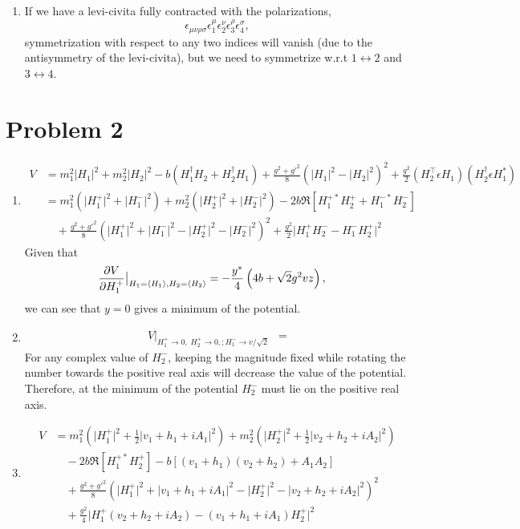 \documentclass[12pt]{article}
\newcommand{\magsq}[1]{\big|#1\big|^2}
\begin{document}
\begin{enumerate}[label=(\alph*)]
    \item If we have a levi-civita fully contracted with the polarizations,
    \[ \epsilon_{\mu\nu\rho\sigma}\epsilon_1^\mu\epsilon_2^\nu\epsilon_3^\rho\epsilon_4^\sigma, \]
    symmetrization with respect to any two indices will vanish (due to the antisymmetry of the levi-civita), but we need to symmetrize w.r.t $1\leftrightarrow2$ and $3\leftrightarrow4$.

\end{enumerate}

\section*{Problem 2}
\begin{enumerate}[label=(\alph*)]
    \item 
    \begin{align*}
        V &= m_1^2\magsq{H_1} + m_2^2\magsq{H_2} - b(H_1^\dag H_2 + H_2^\dag H_1) + \frac{g^2 + g'^2}{8}\left(\magsq{H_1}-\magsq{H_2}\right)^2 + \frac{g^2}{2}\left(H_2^\intercal\epsilon H_1\right)\left(H_2^\dag\epsilon H_1^*\right) \\
        &= m_1^2\left(\magsq{H_1^+} + \magsq{H_1^-}\right) + m_2^2\left(\magsq{H_2^+} + \magsq{H_2^-}\right) - 2b\Re[H_1^{+*}H_2^+ + H_1^{-*}H_2^{-}] \\
        &\quad + \frac{g^2 + g'^2}{8}\left(\magsq{H_1^+} + \magsq{H_1^-} - \magsq{H_2^+} - \magsq{H_2^-}\right)^2 + \frac{g^2}{2}\magsq{H_1^+H_2^- - H_1^-H_2^+}
    \end{align*}
    Given that
    \begin{align*}
        \pdv{V}{H_1^+}\bigr\lvert_{H_1 = \left<H_1\right>, H_2 = \left<H_2\right>} &= -\frac{y^*}{4}\left(4b + \sqrt{2}g^2vz\right),
    \end{align*}
    we can see that $y=0$ gives a minimum of the potential.

    \item 
    \begin{align*}
        V\bigr\lvert_{H_1^+\to0,\;H_2^+\to0,;H_1^-\to v/\sqrt{2}} &= 
    \end{align*}
    For any complex value of $H_2^-$, keeping the magnitude fixed while rotating the number towards the positive real axis will decrease the value of the potential. Therefore, at the minimum of the potential $H_2^-$ must lie on the positive real axis.

    \item 
    \begin{align*}
        V &= m_1^2\left(\magsq{H_1^+} + \frac{1}{2}\magsq{v_1 + h_1 + iA_1}\right) + m_2^2\left(\magsq{H_2^+} + \frac{1}{2}\magsq{v_2 + h_2 + iA_2}\right) \\
        &\quad - 2b\Re[H_1^{+*}H_2^+] - b\left[(v_1+h_1)(v_2 + h_2) + A_1A_2\right] \\
        &\quad + \frac{g^2 + g'^2}{8}\left(\magsq{H_1^+} + \magsq{v_1 + h_1 + iA_1} - \magsq{H_2^+} - \magsq{v_2 + h_2 + iA_2}\right)^2 \\
        &\quad + \frac{g^2}{4}\magsq{H_1^+\left(v_2 + h_2 + iA_2\right) - \left(v_1 + h_1 + iA_1\right)H_2^+} 
    \end{align*}


\end{enumerate}
\end{document}
